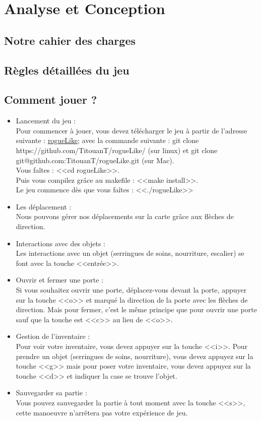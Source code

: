 \documentclass[12pt]{report}
\begin{document}
\chapter{Analyse et Conception}

	\section{Notre cahier des charges}
	
	\section{Règles détaillées du jeu}
	
	\section{Comment jouer ?}
		\begin{itemize}
			\item{Lancement du jeu : \\}
				Pour commencer à jouer, vous devez télécharger le jeu à partir de l'adresse suivante : \href{https://github.com/TitouanT/rogueLike/} {rogueLike}; avec la commande suivante : git clone https://github.com/TitouanT/rogueLike/ (sur linux) et git clone git@github.com:TitouanT/rogueLike.git (sur Mac). \\
				Vous faîtes : <<cd rogueLike>>. \\
				Puis vous compilez grâce au makefile : <<make install>>. \\
				Le jeu commence dès que vous faîtes : <<./rogueLike>>		
			\item{Les déplacement : \\}
				Nous pouvons gérer nos déplacements sur la carte grâce aux flèches de direction. 
			\item{Interactions avec des objets : \\}	
				Les interactions avec un objet (serringues de soins, nourriture, escalier) se font avec la touche <<entrée>>.
			\item{Ouvrir et fermer une porte :\\}	
				Si vous souhaitez ouvrir une porte, déplacez-vous devant la porte, appuyer sur la touche <<o>> et marqué la direction de la porte avec les flèches de direction.
				Mais pour fermer, c'est le même principe que pour ouvrir une porte sauf que la touche est <<c>> au lieu de <<o>>.
			\item{Gestion de l'inventaire : \\}
				Pour voir votre inventaire, vous devez appuyer sur la touche <<i>>. Pour prendre un objet (serringues de soins, nourriture), vous devez appuyez sur la touche <<g>> mais pour poser votre inventaire, vous devez appuyez sur la touche <<d>> et indiquer la case se trouve l'objet.
			\item{Sauvegarder sa partie :\\}
				Vous pouvez sauvegarder la partie à tout moment avec la touche <<s>>, cette manoeuvre n'arrêtera pas votre expérience de jeu.		
		\end{itemize}
		
\end{document}
